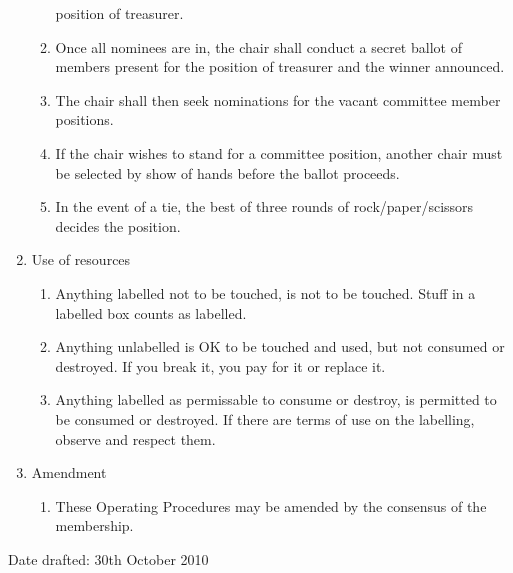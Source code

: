 \documentclass{article}
\begin{document}
\begin{enumerate}
\begin{enumerate}
    position of treasurer.
  \item Once all nominees are in, the chair shall conduct a secret
    ballot of members present for the position of treasurer and the
    winner announced.
  \item The chair shall then seek nominations for the vacant committee
    member positions.
  \item If the chair wishes to stand for a committee position, another
    chair must be selected by show of hands before the ballot proceeds.
  \item In the event of a tie, the best of three rounds of
    rock/paper/scissors decides the position.
  \end{enumerate}
\item Use of resources
  \begin{enumerate}
  \item Anything labelled not to be touched, is not to be
    touched. Stuff in a labelled box counts as labelled.
  \item Anything unlabelled is OK to be touched and used, but not consumed or destroyed. If you break it, you pay for it or replace it.
  \item Anything labelled as permissable to consume or destroy, is
    permitted to be consumed or destroyed. If there are terms of use
    on the labelling, observe and respect them.
  \end{enumerate}
\item Amendment
  \begin{enumerate}
  \item These Operating Procedures may be amended by the consensus of the membership.
  \end{enumerate} %
  
\end{enumerate}
\bigskip
Date drafted: 30th October 2010
\end{document}
